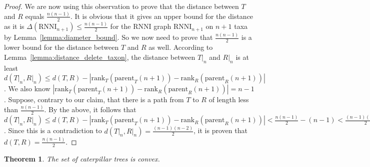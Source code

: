 \documentclass{amsart}
\newcommand{\parent}{\mathrm{parent}}
\newcommand{\rank}{\mathrm{rank}}
\newcommand{\rnni}{\mathrm{RNNI}}
\newtheorem{theorem}[definition]{Theorem}
\begin{document}
\begin{proof}
We are now using this observation to prove that the distance between $T$ and $R$ equals $\frac{n(n-1)}{2}$.
It is obvious that it gives an upper bound for the distance as it is $\Delta(\rnni_{n+1}) \leq \frac{n(n-1)}{2}$ for the $\rnni$ graph $\rnni_{n+1}$ on $n+1$ taxa by Lemma~\ref{lemma:diameter_bound}.
So we now need to prove that $\frac{n(n-1)}{2}$ is a lower bound for the distance between $T$ and $R$ as well.
According to Lemma~\ref{lemma:distance_delete_taxon}, the distance between $T{\big|}_n$ and $R{\big|}_n$ is at least $d(T{\big|}_n, R{\big|}_n) \leq d(T,R) - |\rank_T(\parent_T(n+1)) - \rank_R(\parent_R(n+1))|$.
We also know $|\rank_T(\parent_T(n+1)) - \rank_R(\parent_R(n+1))| = n-1$.
Suppose, contrary to our claim, that there is a path from $T$ to $R$ of length less than $\frac{n(n-1)}{2}$.
By the above, it follows that $d(T{\big|}_n, R{\big|}_n) \leq d(T,R) - |\rank_T(\parent_T(n+1)) - \rank_R(\parent_R(n+1))| < \frac{n(n-1)}{2} - (n-1) < \frac{(n-1)(n-2)}{2}$.
Since this is a contradiction to $d(T{\big|}_n, R{\big|}_n) = \frac{(n-1)(n-2)}{2}$, it is proven that $d(T,R) = \frac{n(n-1)}{2} $.
\end{proof}

\begin{theorem}
The set of caterpillar trees is convex.
\label{thm:caterpillar_convex}
\end{theorem}
\end{document}
